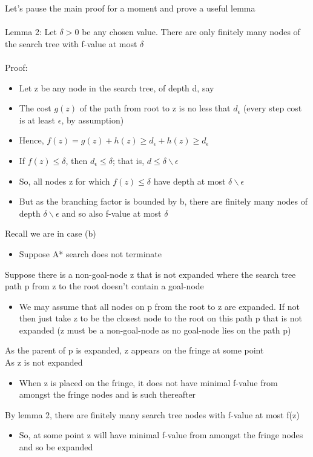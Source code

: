 \documentclass{article}[18pt]
\begin{document}
Let's pause the main proof for a moment and prove a useful lemma\\
\\
Lemma 2: Let $\delta>0$ be any chosen value. There are only finitely many nodes of the search tree with f-value at most $\delta$\\
\\
Proof: 
\begin{itemize}
	\item Let z be any node in the search tree, of depth d, say
	\item The cost $g(z)$ of the path from root to z is no less that $d_\epsilon$ (every step cost is at least $\epsilon$, by assumption)
	\item Hence, $f(z)=g(z)+h(z)\geqslant d_\epsilon + h(z) \geqslant d_\epsilon$
	\item If $f(z)\leqslant \delta$, then $d_\epsilon \leqslant \delta$; that is, $d\leqslant \delta \backslash \epsilon$
	\item So, all nodes z for which $f(z)\leqslant \delta$ have depth at most $\delta \backslash \epsilon$
	\item But as the branching factor is bounded by b, there are finitely many nodes of depth $\delta \backslash \epsilon$ and so also f-value at most $\delta$
\end{itemize}
Recall we are in case (b)
\begin{itemize}
	\item Suppose A* search does not terminate
\end{itemize}
Suppose there is a non-goal-node z that is not expanded where the search tree path p from z to the root doesn't contain a goal-node
\begin{itemize}
	\item We may assume that all nodes on p from the root to z are expanded. If not then just take z to be the closest node to the root on this path p that is not expanded (z must be a non-goal-node as no goal-node lies on the path p)
\end{itemize}
As the parent of p is expanded, z appears on the fringe at some point\\
As z is not expanded
\begin{itemize}
	\item When z is placed on the fringe, it does not have minimal f-value from amongst the fringe nodes and is such thereafter
\end{itemize}
By lemma 2, there are finitely many search tree nodes with f-value at most f(z)
\begin{itemize}
	\item So, at some point z will have minimal f-value from amongst the fringe nodes and so be expanded
\end{itemize}
\end{document}
